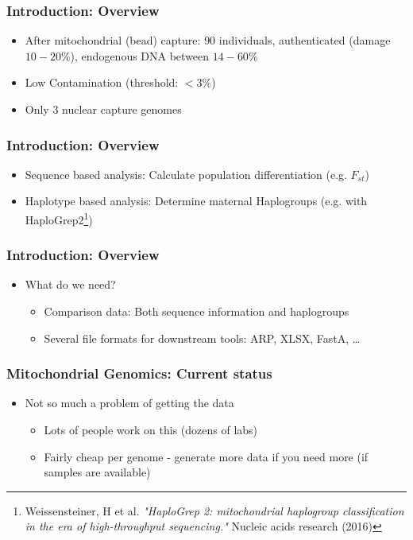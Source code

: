 \documentclass{beamer} %
\begin{document}
\begin{frame}
\frametitle{Introduction: Overview}
\begin{itemize}
\item After mitochondrial (bead) capture: $90$ individuals, authenticated (damage $10-20\%$), endogenous DNA between $14-60\%$
\item Low Contamination (threshold: $<3\%$) 
\item Only 3 nuclear capture genomes
\end{itemize}
\end{frame}

\begin{frame}
\frametitle{Introduction: Overview}
\begin{itemize}
\item Sequence based analysis: Calculate population differentiation (e.g. $F_{st}$)
\item Haplotype based analysis: Determine maternal Haplogroups (e.g. with HaploGrep2\footnote{Weissensteiner, H et al. \textit{"HaploGrep 2: mitochondrial haplogroup classification in the era of high-throughput sequencing."} Nucleic acids research (2016)})
\end{itemize}
\end{frame}

\begin{frame}
\frametitle{Introduction: Overview}
\begin{itemize}
\item What do we need? \pause
\begin{itemize}
\item Comparison data: Both sequence information and haplogroups \pause
\item Several file formats for downstream tools: ARP, XLSX, FastA, \ldots
\end{itemize}
\end{itemize}
\end{frame}

\begin{frame}
\frametitle{Mitochondrial Genomics: Current status}
\begin{itemize}
\item Not so much a problem of getting the data
\pause
\begin{itemize}
\item Lots of people work on this (dozens of labs)\pause
\item Fairly cheap per genome - generate more data if you need more (if samples are available) 
\end{itemize}
\end{itemize}
\end{frame}
\end{document}
